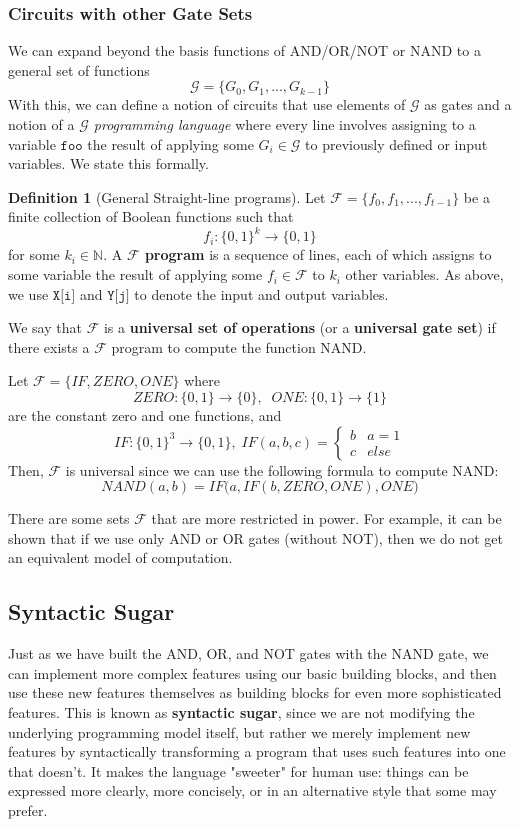 \documentclass[a4paper, 12pt]{report}
\theoremstyle{remark}
\theoremstyle{definition}
\newtheorem{definition}{Definition}[section]
\begin{document}
\subsubsection{Circuits with other Gate Sets}
We can expand beyond the basis functions of AND/OR/NOT or NAND to a general set of functions 
\[\mathcal{G} = \{G_0, G_1, ..., G_{k-1}\}\]
With this, we can define a notion of circuits that use elements of $\mathcal{G}$ as gates and a notion of a \textit{$\mathcal{G}$ programming language} where every line involves assigning to a variable $\texttt{foo}$ the result of applying some $G_i \in \mathcal{G}$ to previously defined or input variables. We state this formally. 

\begin{definition}[General Straight-line programs]
Let $\mathcal{F} = \{f_0, f_1, ..., f_{t-1}\}$ be a finite collection of Boolean functions such that
\[f_i: \{0,1\}^k \longrightarrow \{0,1\}\]
for some $k_i \in \mathbb{N}$. A \textbf{$\mathcal{F}$ program} is a sequence of lines, each of which assigns to some variable the result of applying some $f_i \in \mathcal{F}$ to $k_i$ other variables. As above, we use $\texttt{X[i]}$ and $\texttt{Y[j]}$ to denote the input and output variables. 

We say that $\mathcal{F}$ is a \textbf{universal set of operations} (or a \textbf{universal gate set}) if there exists a $\mathcal{F}$ program to compute the function NAND. 
\end{definition}

\begin{example}
Let $\mathcal{F} = \{IF, ZERO, ONE\}$ where 
\[ZERO: \{0,1\} \longrightarrow \{0\}, \;\; ONE: \{0,1\} \longrightarrow \{1\}\]
are the constant zero and one functions, and 
\[IF: \{0,1\}^3 \longrightarrow \{0,1\}, \; IF (a, b, c) = \begin{cases}
b & a = 1 \\
c & else 
\end{cases}\]
Then, $\mathcal{F}$ is universal since we can use the following formula to compute NAND: 
\[NAND(a, b) = IF\big( a, IF(b, ZERO, ONE), ONE\big)\]
\end{example}

There are some sets $\mathcal{F}$ that are more restricted in power. For example, it can be shown that if we use only AND or OR gates (without NOT), then we do not get an equivalent model of computation. 

\subsection{Syntactic Sugar}
Just as we have built the AND, OR, and NOT gates with the NAND gate, we can implement more complex features using our basic building blocks, and then use these new features themselves as building blocks for even more sophisticated features. This is known as \textbf{syntactic sugar}, since we are not modifying the underlying programming model itself, but rather we merely implement new features by syntactically transforming a program that uses such features into one that doesn’t. It makes the language "sweeter" for human use: things can be expressed more clearly, more concisely, or in an alternative style that some may prefer.
\end{document}

